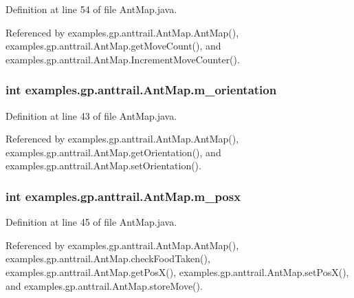 Definition at line 54 of file Ant\-Map.\-java.



Referenced by examples.\-gp.\-anttrail.\-Ant\-Map.\-Ant\-Map(), examples.\-gp.\-anttrail.\-Ant\-Map.\-get\-Move\-Count(), and examples.\-gp.\-anttrail.\-Ant\-Map.\-Increment\-Move\-Counter().

\hypertarget{classexamples_1_1gp_1_1anttrail_1_1_ant_map_acbb73a15f0ac5587a9b0699214336fe4}{
\subsubsection[{m\-\_\-orientation}]{\setlength{\rightskip}{0pt plus 5cm}int examples.\-gp.\-anttrail.\-Ant\-Map.\-m\-\_\-orientation\hspace{0.3cm}{\ttfamily [private]}}}\label{classexamples_1_1gp_1_1anttrail_1_1_ant_map_acbb73a15f0ac5587a9b0699214336fe4}


Definition at line 43 of file Ant\-Map.\-java.



Referenced by examples.\-gp.\-anttrail.\-Ant\-Map.\-Ant\-Map(), examples.\-gp.\-anttrail.\-Ant\-Map.\-get\-Orientation(), and examples.\-gp.\-anttrail.\-Ant\-Map.\-set\-Orientation().

\hypertarget{classexamples_1_1gp_1_1anttrail_1_1_ant_map_a78bbd25205b3dbd31d534b48305479fc}{
\subsubsection[{m\-\_\-posx}]{\setlength{\rightskip}{0pt plus 5cm}int examples.\-gp.\-anttrail.\-Ant\-Map.\-m\-\_\-posx\hspace{0.3cm}{\ttfamily [private]}}}\label{classexamples_1_1gp_1_1anttrail_1_1_ant_map_a78bbd25205b3dbd31d534b48305479fc}


Definition at line 45 of file Ant\-Map.\-java.



Referenced by examples.\-gp.\-anttrail.\-Ant\-Map.\-Ant\-Map(), examples.\-gp.\-anttrail.\-Ant\-Map.\-check\-Food\-Taken(), examples.\-gp.\-anttrail.\-Ant\-Map.\-get\-Pos\-X(), examples.\-gp.\-anttrail.\-Ant\-Map.\-set\-Pos\-X(), and examples.\-gp.\-anttrail.\-Ant\-Map.\-store\-Move().

